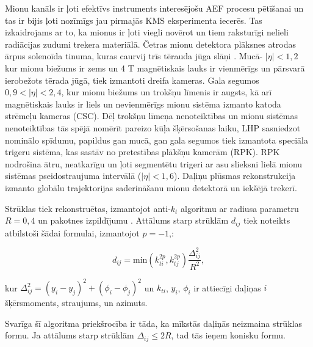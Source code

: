 Mionu kanāls ir ļoti efektīvs instruments interesējošu \gls{AEF} procesu pētīšanai un tas ir bijis ļoti nozīmīgs jau pirmajās KMS eksperimenta iecerēs. Tas izkaidrojams ar to, ka mionus ir ļoti viegli novērot un tiem raksturīgi nelieli radiācijas zudumi trekera materiālā. Četras mionu detektora plāksnes atrodas ārpus solenoīda tinuma, kuras caurvij trīs tērauda jūga slāņi \cite{muon_tech_rep}. Mucā- $\left|\eta\right|<1,2$ kur mionu biežums ir zems un 4 T magnētiskais lauks ir vienmērīgs un pārsvarā ierobežots tērada jūgā, tiek izmantoti dreifa kameras. Gala segumos $0,9<\left|\eta\right|<2,4$, kur mionu biežums un trokšņu līmenis ir augsts, kā arī magnētiskais lauks ir liels un nevienmērīgs mionu sistēma izmanto katoda strēmeļu kameras (CSC). Dēļ trokšņu līmeņa nenoteiktības un mionu sistēmas nenoteiktības tās spējā nomērīt pareizo kūļa šķērsošanas laiku, LHP sasniedzot nominālo spīdumu, papildus gan mucā, gan gala segumos tiek izmantota speciāla trigeru sistēma, kas sastāv no pretestības plākšņu kamerām (RPK). RPK nodrošina ātru, neatkarīgu un ļoti segmentētu trigeri ar asu \pt slieksni lielā mionu sistēmas pseidostraujuma intervālā ($\left|\eta\right|<1,6$). Daļiņu plūsmas rekonstrukcija izmanto globālu trajektorijas saderināšanu mionu detektorā un iekšējā trekerī. 

Strūklas tiek rekonstruētas, izmantojot anti-$k_{t}$ algoritmu \cite{Cacciari:2008gp} ar radiusa parametru $R=0,4$ un \FASTJET pakotnes izpildījumu \cite{Cacciari:2011ma}. Attālums starp strūklām $d_{ij}$ tiek noteikts atbilstoši šādai formulai, izmantojot $p=-1$,:

\begin{equation}
d_{ij}=\text{min}(k_{ti}^{2p}, k_{tj}^{2p})\frac{\Delta_{ij}^{2}}{R^{2}},
\end{equation}

kur $\Delta_{ij}^{2}=(y_{i}-y_{j})^{2}+(\phi_{i}-\phi_{j})^{2}$ un $k_{ti}$, $y_{i}$, $\phi_{i}$ ir attiecīgi daļiņas $i$ šķērsmoments, straujums, un azimuts. 

Svarīga šī algoritma priekšrocība ir tāda, ka \gls{mīkstās} daļiņās neizmaina strūklas formu. Ja attālums starp strūklām $\Delta_{ij}\leq2R$, tad tās ieņem konisku formu. 
